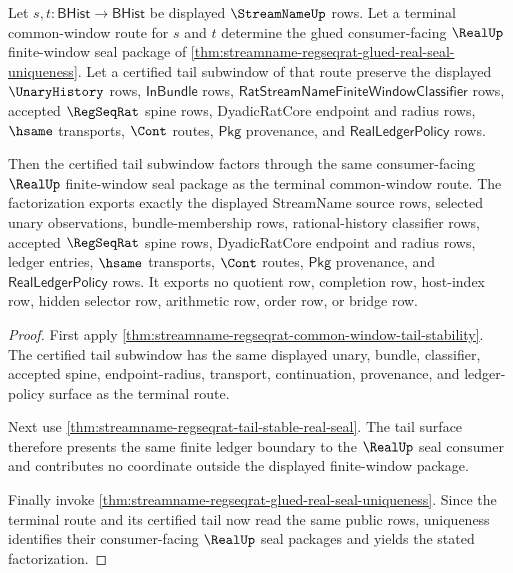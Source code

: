 \begin{theorem}
\label{thm:streamname-regseqrat-terminal-tail-subwindow-factorization}
Let $s,t:\mathsf{BHist}\to\mathsf{BHist}$ be displayed $\StreamNameUp$ rows.
Let a terminal common-window route for $s$ and $t$ determine the glued
consumer-facing $\RealUp$ finite-window seal package of
\autoref{thm:streamname-regseqrat-glued-real-seal-uniqueness}. Let a
certified tail subwindow of that route preserve the displayed $\UnaryHistory$
rows, $\mathsf{InBundle}$ rows,
$\mathsf{RatStreamNameFiniteWindowClassifier}$ rows, accepted $\RegSeqRat$
spine rows, DyadicRatCore endpoint and radius rows, $\hsame$ transports,
$\Cont$ routes, $\mathsf{Pkg}$ provenance, and
$\mathsf{RealLedgerPolicy}$ rows.

Then the certified tail subwindow factors through the same consumer-facing
$\RealUp$ finite-window seal package as the terminal common-window route. The
factorization exports exactly the displayed StreamName source rows, selected
unary observations, bundle-membership rows, rational-history classifier rows,
accepted $\RegSeqRat$ spine rows, DyadicRatCore endpoint and radius rows,
ledger entries, $\hsame$ transports, $\Cont$ routes, $\mathsf{Pkg}$
provenance, and $\mathsf{RealLedgerPolicy}$ rows. It exports no quotient row,
completion row, host-index row, hidden selector row, arithmetic row, order row,
or bridge row.
\end{theorem}
\begin{proof}
First apply
\autoref{thm:streamname-regseqrat-common-window-tail-stability}. The certified
tail subwindow has the same displayed unary, bundle, classifier, accepted
spine, endpoint-radius, transport, continuation, provenance, and ledger-policy
surface as the terminal route.

Next use \autoref{thm:streamname-regseqrat-tail-stable-real-seal}. The tail
surface therefore presents the same finite ledger boundary to the $\RealUp$
seal consumer and contributes no coordinate outside the displayed
finite-window package.

Finally invoke
\autoref{thm:streamname-regseqrat-glued-real-seal-uniqueness}. Since the
terminal route and its certified tail now read the same public rows, uniqueness
identifies their consumer-facing $\RealUp$ seal packages and yields the stated
factorization.
\end{proof}
